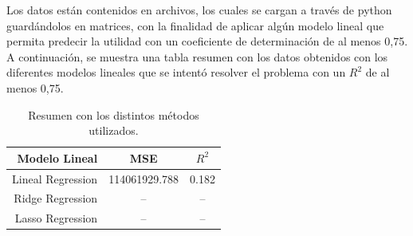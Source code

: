 \documentclass[letter, 10pt]{article}
\begin{document}
Los datos están contenidos en archivos, los cuales se cargan a través de python guardándolos en matrices, con la finalidad de aplicar algún modelo lineal que permita predecir la utilidad con un coeficiente de determinación de al menos 0,75.\\

A continuación, se muestra una tabla resumen con los datos obtenidos con los diferentes modelos lineales que se intentó resolver el problema con un $R^2$ de al menos 0,75.

\begin{table}[!hbt] 
\begin{center}
\begin{tabular}{| r | c | c |} 
\hline
\textbf{Modelo Lineal} & \textbf{MSE} & \textbf{$R^2$}\\ 
\hline 
Lineal Regression & 114061929.788 & 0.182\\ 
Ridge Regression &-- & --\\
Lasso Regression &--& --\\
\hline 
\end{tabular}
\caption{Resumen con los distintos métodos utilizados.} 
\label{table:peliculas}
\end{center} 
\end{table}



\end{document}
